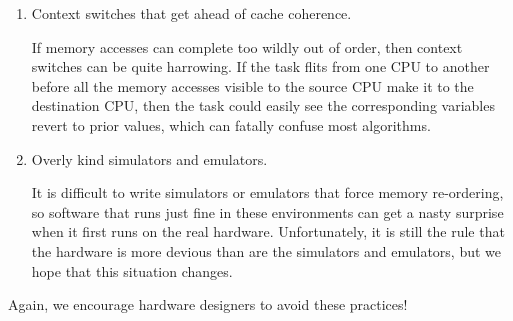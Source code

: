 \begin{enumerate}
\item	Context switches that get ahead of cache coherence.

	If memory accesses can complete too wildly out of order,
	then context switches can be quite harrowing.
	If the task flits from one CPU to another before all the
	memory accesses visible to the source CPU make it to the
	destination CPU, then the task could easily see the corresponding
	variables revert to prior values, which can fatally confuse
	most algorithms.

\item	Overly kind simulators and emulators.

	It is difficult to write simulators or emulators that force
	memory re-ordering, so software that runs just fine in
	these environments can get a nasty surprise when it first
	runs on the real hardware.
	Unfortunately, it is still the rule that the hardware is more
	devious than are the simulators and emulators, but we hope that
	this situation changes.
\end{enumerate}

Again, we encourage hardware designers to avoid these practices!
